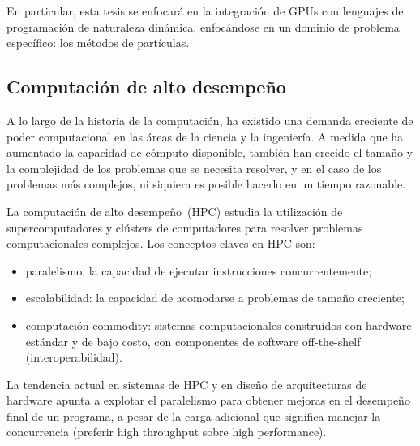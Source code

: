 \documentclass[11pt,spanish]{article}
\begin{document}
En particular, esta tesis se enfocará en la integración de GPUs con lenguajes de
programación de naturaleza dinámica, enfocándose en un dominio de problema
específico: los métodos de partículas.


\subsection{Computación de alto desempeño}

A lo largo de la historia de la computación, ha existido una demanda creciente de poder
computacional en las áreas de la ciencia y la ingeniería.  A medida que ha
aumentado la capacidad de cómputo disponible, también han crecido el tamaño y la
complejidad de los problemas que se necesita resolver, y en el caso de los
problemas más complejos, ni siquiera es posible hacerlo en un tiempo razonable.
\cite{parallel-programming}

La computación de alto desempeño~(HPC) estudia la utilización de supercomputadores y
clústers de computadores para resolver problemas computacionales complejos.  Los
conceptos claves en HPC son:
\begin{itemize}
   \item paralelismo:
     la capacidad de ejecutar instrucciones concurrentemente;
   \item escalabilidad:
     la capacidad de acomodarse a problemas de tamaño creciente;
   \item computación commodity:
     sistemas computacionales construídos con hardware
     estándar y de bajo costo, con componentes de software off-the-shelf
     (interoperabilidad).
\end{itemize}
La tendencia actual en sistemas de HPC y en diseño de arquitecturas de hardware
apunta a explotar el paralelismo para obtener mejoras en el desempeño final de un
programa, a pesar de la carga adicional que significa manejar la concurrencia
(preferir high throughput sobre high performance).
\end{document}
